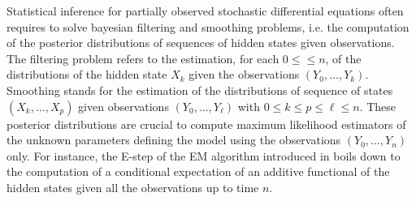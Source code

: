 \documentclass[12pt]{article}
\newcommand{\rmd}{\mathrm{d}}
\newcommand{\eqsp}{\;}
\newcommand{\1}{\mathrm{1}}
\newcommand{\qk}{q_{k}}
\begin{document}
Statistical inference for partially observed stochastic differential equations often requires to solve bayesian filtering and smoothing problems, i.e. the computation of the posterior distributions of sequences of hidden states given observations. The filtering problem refers to the estimation, for each $0\le \le n$,  of the distributions of the hidden state $X_k$ given the observations $(Y_0,\ldots,Y_k)$. Smoothing stands for the estimation of the distributions of sequence of states $(X_{k},\ldots,X_{p})$ given observations $(Y_{0},\ldots,Y_{\ell})$ with $0\le k\le p \le \ell \le n$. 
These posterior distributions are crucial to compute maximum likelihood estimators of the unknown parameters defining the model using the observations $(Y_0,\ldots,Y_n)$ only.
For instance, the E-step of the EM algorithm introduced in \cite{dempster:laird:rubin:1977} %
boils down to the computation of a conditional expectation of an additive functional of the hidden states given all the observations up to time $n$. 
\end{document}
